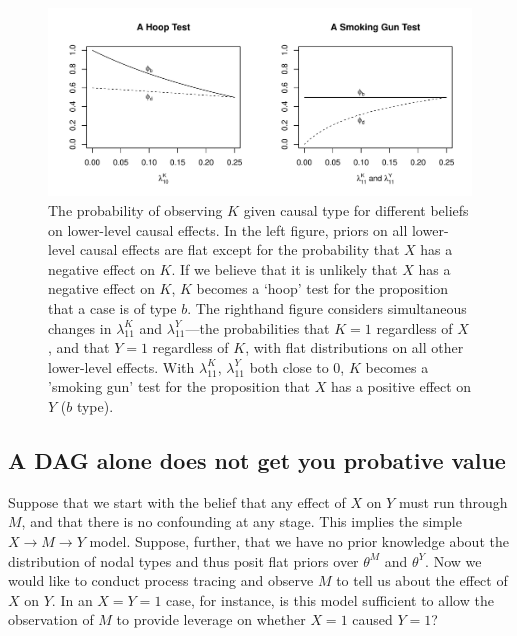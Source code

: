 \documentclass[
  12pt,
]{book}
\begin{document}
\begin{figure}

{\centering \includegraphics[width=.85\textwidth]{ii_files/figure-latex/phis-1} 

}

\caption{The probability of observing $K$ given causal type for different beliefs on lower-level causal effects. In the left figure, priors on all lower-level causal effects are flat except for the probability that $X$ has a negative effect on $K$. If we believe that it is unlikely that $X$ has a negative effect on $K$, $K$ becomes a `hoop' test for the proposition that a case is of type $b$. The righthand figure considers simultaneous changes in $\lambda_{11}^K$ and  $\lambda_{11}^Y$---the probabilities that $K=1$ regardless of $X$, and that $Y=1$  regardless of $K$, with flat distributions on all other lower-level effects. With $\lambda_{11}^K$, $\lambda_{11}^Y$ both close to 0, $K$ becomes a 'smoking gun' test for the proposition that $X$ has a positive effect on $Y$ ($b$ type).}\label{fig:phis}
\end{figure}

\hypertarget{a-dag-alone-does-not-get-you-probative-value}{%
\subsection{A DAG alone does not get you probative value}\label{a-dag-alone-does-not-get-you-probative-value}}

Suppose that we start with the belief that any effect of \(X\) on \(Y\) must run through \(M\), and that there is no confounding at any stage. This implies the simple \(X \rightarrow M \rightarrow Y\) model. Suppose, further, that we have no prior knowledge about the distribution of nodal types and thus posit flat priors over \(\theta^M\) and \(\theta^Y\). Now we would like to conduct process tracing and observe \(M\) to tell us about the effect of \(X\) on \(Y\). In an \(X=Y=1\) case, for instance, is this model sufficient to allow the observation of \(M\) to provide leverage on whether \(X=1\) caused \(Y=1\)?
\end{document}
